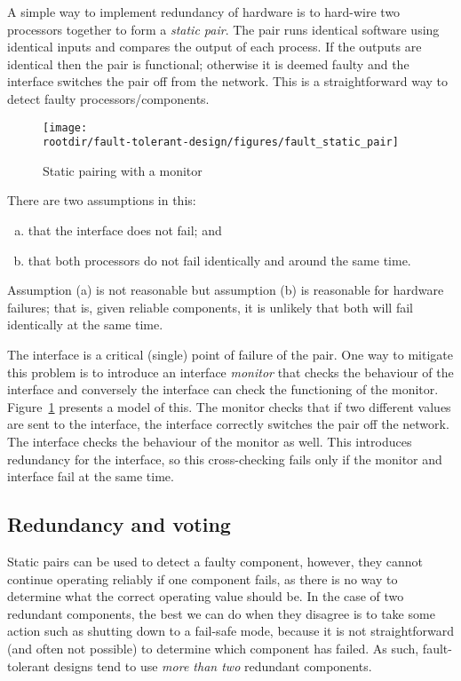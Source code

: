 A simple way to implement redundancy of hardware is to hard-wire two processors together to form a \emph{static pair}. The pair runs identical software using identical inputs and compares the output of each process.  If the outputs are identical then the pair is functional; otherwise it is deemed faulty and the interface switches the pair off from the network. This is a straightforward way to detect faulty processors/components.

\begin{figure}[!h]
\centering
  \texttt{[image: \\rootdir/fault-tolerant-design/figures/fault\_static\_pair]}
\caption{Static pairing with a monitor}
\label{fig:fault-tolerance:static-pair}
\end{figure}


There are two assumptions in this:

\begin{enumerate}[(a)]

  \item that the interface does not fail; and

  \item that both processors do not fail identically and around
the same time. 

\end{enumerate}

Assumption (a) is not reasonable but assumption (b) is reasonable for hardware failures; that is, given reliable components, it is unlikely that both will fail identically at the same time.


The interface is a critical (single) point of failure of the pair. One way to mitigate this problem is to introduce an interface \emph{monitor} that checks the behaviour of the interface and conversely the interface can check the functioning of the monitor. Figure~\ref{fig:fault-tolerance:static-pair} presents a model of this. The monitor checks that if two different values are sent to the interface, the interface correctly switches the pair off the network. The interface checks the behaviour of the monitor as well. This introduces redundancy for the interface, so this cross-checking fails only if the monitor and interface fail at the same time.

\subsection{Redundancy and voting}

Static pairs can be used to detect a faulty component, however, they cannot continue operating reliably if one component fails, as there is no way to determine what the correct operating value should be. In the case of two redundant components, the best we can do when they disagree is to take some action such as shutting down to a fail-safe mode, because it is not straightforward (and often not possible) to determine which component has failed. As such, fault-tolerant designs tend to use \emph{more than two} redundant components.

